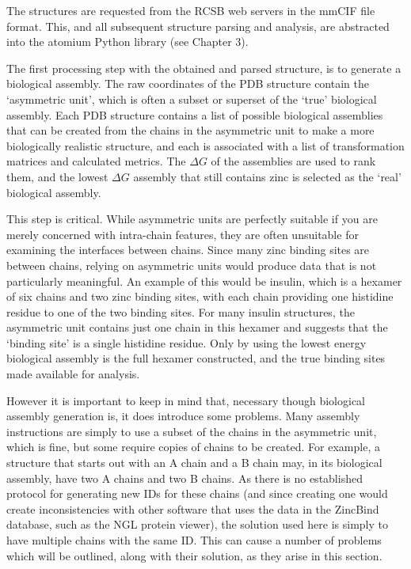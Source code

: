 The structures are requested from the RCSB web servers in the mmCIF file format. This, and all subsequent structure parsing and analysis, are abstracted into the atomium Python library (see Chapter 3).

The first processing step with the obtained and parsed structure, is to generate a biological assembly. The raw coordinates of the PDB structure contain the `asymmetric unit', which is often a subset or superset of the `true' biological assembly. Each PDB structure contains a list of possible biological assemblies that can be created from the chains in the asymmetric unit to make a more biologically realistic structure, and each is associated with a list of transformation matrices and calculated metrics. The $\Delta G$ of the assemblies are used to rank them, and the lowest $\Delta G$ assembly that still contains zinc is selected as the `real' biological assembly.

This step is critical. While asymmetric units are perfectly suitable if you are merely concerned with intra-chain features, they are often unsuitable for examining the interfaces between chains. Since many zinc binding sites are between chains, relying on asymmetric units would produce data that is not particularly meaningful. An example of this would be insulin, which is a hexamer of six chains and two zinc binding sites, with each chain providing one histidine residue to one of the two binding sites. For many insulin structures, the asymmetric unit contains just one chain in this hexamer and suggests that the `binding site' is a single histidine residue. Only by using the lowest energy biological assembly is the full hexamer constructed, and the true binding sites made available for analysis.

However it is important to keep in mind that, necessary though biological assembly generation is, it does introduce some problems. Many assembly instructions are simply to use a subset of the chains in the asymmetric unit, which is fine, but some require copies of chains to be created. For example, a structure that starts out with an A chain and a B chain may, in its biological assembly, have two A chains and two B chains. As there is no established protocol for generating new IDs for these chains (and since creating one would create inconsistencies with other software that uses the data in the ZincBind database, such as the NGL protein viewer), the solution used here is simply to have multiple chains with the same ID. This can cause a number of problems which will be outlined, along with their solution, as they arise in this section.

